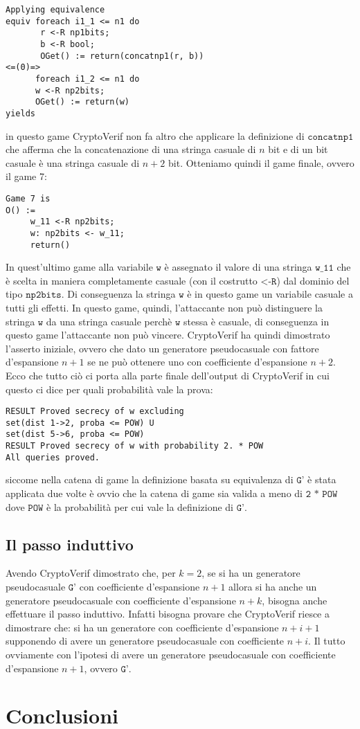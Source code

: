 \documentclass[a4paper,openright,twoside,12pt]{report}
\begin{document}
\begin{verbatim} 
Applying equivalence
equiv foreach i1_1 <= n1 do 
       r <-R np1bits; 
       b <-R bool; 
       OGet() := return(concatnp1(r, b))
<=(0)=>
      foreach i1_2 <= n1 do 
      w <-R np2bits; 
      OGet() := return(w)
yields
\end{verbatim}
in questo game CryptoVerif non fa altro che applicare la definizione di $\texttt{concatnp1}$ che afferma che la concatenazione di una stringa casuale di $n$ bit e di un bit casuale \`e una stringa casuale di $n+2$ bit.
Otteniamo quindi il game finale, ovvero il game 7:
\begin{verbatim}
Game 7 is
O() :=
     w_11 <-R np2bits;
     w: np2bits <- w_11;
     return()
\end{verbatim}
In quest'ultimo game alla variabile $\texttt{w}$ \`e assegnato il valore di una stringa $\texttt{w\_11}$ che \`e scelta in maniera completamente casuale (con il costrutto $\texttt{<-R}$) dal dominio del tipo $\texttt{np2bits}$.
Di conseguenza la stringa $\texttt{w}$ \`e in questo game un variabile casuale a tutti gli effetti.
In questo game, quindi, l'attaccante non pu\`o distinguere la stringa $\texttt{w}$ da una stringa casuale perch\`e $\texttt{w}$ stessa \`e casuale, di conseguenza in questo game l'attaccante non pu\`o vincere.
CryptoVerif ha quindi dimostrato l'asserto iniziale, ovvero che dato un generatore pseudocasuale con fattore d'espansione $n+1$ se ne pu\`o ottenere uno con coefficiente d'espansione $n+2$.
Ecco che tutto ci\`o ci porta alla parte finale dell'output di CryptoVerif in cui questo ci dice per quali probabilit\`a vale la prova:
\begin{verbatim} 
RESULT Proved secrecy of w excluding 
set(dist 1->2, proba <= POW) U 
set(dist 5->6, proba <= POW)
RESULT Proved secrecy of w with probability 2. * POW
All queries proved.
\end{verbatim}
siccome nella catena di game la definizione basata su equivalenza di $\texttt{G'}$ \`e stata applicata due volte \`e ovvio che la catena di game sia valida a meno di $\texttt{2 * POW}$ dove $\texttt{POW}$ \`e la probabilit\`a
per cui vale la definizione di $\texttt{G'}$.
\section{Il passo induttivo}
Avendo CryptoVerif dimostrato che, per $k=2$, se si ha un generatore pseudocasuale $\texttt{G'}$ con coefficiente d'espansione $n+1$ 
allora si ha anche un generatore pseudocasuale con coefficiente d'espansione $n+k$, 
bisogna anche effettuare il passo induttivo. 
Infatti bisogna provare che CryptoVerif riesce a dimostrare che: si ha un generatore con coefficiente d'espansione $n+i+1$ supponendo di avere un generatore pseudocasuale con coefficiente
$n+i$. Il tutto ovviamente con l'ipotesi di avere un generatore pseudocasuale con coefficiente d'espansione $n+1$, ovvero $\texttt{G'}$.
\chapter{Conclusioni}
\lhead[\fancyplain{}{\bfseries\thepage}]{\fancyplain{}{\bfseries\rightmark}}
	
		
\end{document}
